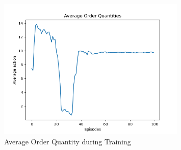 \begin{figure}[H]
    \centering
    \includegraphics[width=0.8\textwidth]{figure/Average Order Quantities copy.png}
    \caption{Average Order Quantity during Training}
    \label{fig:avg-order-quantity}
\end{figure}

